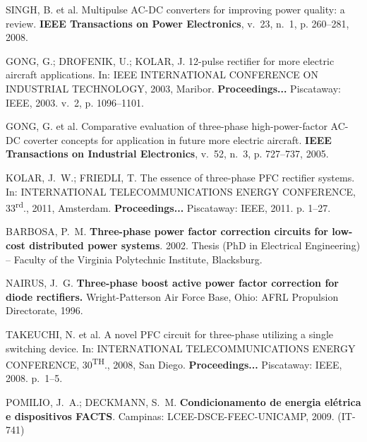 \begin{thebibliography}{}
{SINGH, B. et al. Multipulse {AC-DC} converters for improving power quality: a
  review.
\textbf{IEEE Transactions on Power Electronics}, v.~23, n.~1, p. 260--281,
  2008.}

{GONG, G.; DROFENIK, U.; KOLAR, J. 12-pulse rectifier for more electric
  aircraft applications. In: \uppercase{IEEE International Conference on
  Industrial Technology}, 2003, Maribor. \textbf{Proceedings...} 
  Piscataway: IEEE, 2003. v.~2, p. 1096--1101.}

{GONG, G. et al. Comparative evaluation of three-phase high-power-factor
  {AC-DC} coverter concepts for application in future more electric aircraft.
\textbf{IEEE Transactions on Industrial Electronics}, v.~52, n.~3, p.
  727--737, 2005.}

{KOLAR, J.~W.; FRIEDLI, T. The essence of three-phase {PFC} rectifier systems.
  In: \uppercase{International Telecommunications Energy
  Conference}, 33\textsuperscript{\lowercase{rd}}., 2011, Amsterdam. \textbf{Proceedings...} 
  Piscataway: IEEE, 2011. p. 1--27.}

{BARBOSA, P.~M.
\textbf{Three-phase power factor correction circuits for low-cost distributed
  power systems}. 2002. Thesis (PhD in Electrical Engineering) -- Faculty of the Virginia Polytechnic Institute, Blacksburg.}

{NAIRUS, J.~G. \textbf{Three-phase boost active power factor correction for diode
  rectifiers.} Wright-Patterson Air Force Base,
  Ohio: AFRL Propulsion Directorate, 1996.}

{TAKEUCHI, N. et al. A novel PFC circuit for three-phase utilizing a single
  switching device. In: \uppercase{International Telecommunications
  Energy Conference, 30\textsuperscript{\lowercase{th}}.,} 2008, San Diego. \textbf{Proceedings...} 
  Piscataway: IEEE, 2008. p.~1--5.}

{POMILIO, J.~A.; DECKMANN, S.~M. \textbf{Condicionamento de energia el{\'e}trica
  e dispositivos FACTS}. Campinas: LCEE-DSCE-FEEC-UNICAMP, 2009. (IT-741)}


\end{thebibliography}
